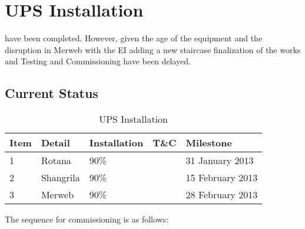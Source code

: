 \chapter{UPS Installation}
\label{ch:ups}

 have been completed. However, given the
age of the equipment and the disruption in Merweb with the EI adding a new staircase
finalization of the works and Testing and Commissioning have been delayed.



\section{Current Status}


\begin{table}[h]
\centering
{\RaggedRight

\begin{tabular}{lllll}
\toprule
Item &Detail &Installation &T\&C &Milestone\\
\midrule
1    & Rotana         & 90\% &    & 31 January 2013 \\
2    & Shangrila      & 90\% &    & 15 February 2013\\
3    & Merweb         & 90\% &    & 28 February 2013\\   
\bottomrule
\end{tabular}
\caption{UPS Installation}
}
\vspace{24pt}
\end{table}

The sequence for commissioning is as follows:

